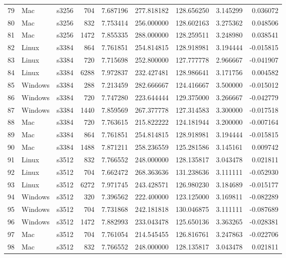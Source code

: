 \documentclass{IEEEtran}
\begin{document}
\begin{longtable}{rllrrrrrr}
  79 & Mac & s3256 &     704 & 7.687196 & 277.818182 & 128.656250 & 3.145299 & 0.036072 \\ 
  80 & Mac & s3256 &     832 & 7.753414 & 256.000000 & 128.602163 & 3.275362 & 0.048506 \\ 
  81 & Mac & s3256 &    1472 & 7.855335 & 288.000000 & 128.259511 & 3.248980 & 0.038541 \\ 
  82 & Linux & s3384 &     864 & 7.761851 & 254.814815 & 128.918981 & 3.194444 & -0.015815 \\ 
  83 & Linux & s3384 &     720 & 7.715698 & 252.800000 & 127.777778 & 2.966667 & -0.041907 \\ 
  84 & Linux & s3384 &    6288 & 7.972837 & 232.427481 & 128.986641 & 3.171756 & 0.004582 \\ 
  85 & Windows & s3384 &     288 & 7.213459 & 282.666667 & 124.416667 & 3.500000 & -0.015012 \\ 
  86 & Windows & s3384 &     720 & 7.747280 & 223.644444 & 129.375000 & 3.266667 & -0.042779 \\ 
  87 & Windows & s3384 &    1440 & 7.859569 & 267.377778 & 127.314583 & 3.300000 & -0.017518 \\ 
  88 & Mac & s3384 &     720 & 7.763615 & 215.822222 & 124.181944 & 3.200000 & -0.007164 \\ 
  89 & Mac & s3384 &     864 & 7.761851 & 254.814815 & 128.918981 & 3.194444 & -0.015815 \\ 
  90 & Mac & s3384 &    1488 & 7.871211 & 258.236559 & 125.281586 & 3.145161 & 0.009742 \\ 
  91 & Linux & s3512 &     832 & 7.766552 & 248.000000 & 128.135817 & 3.043478 & 0.021811 \\ 
  92 & Linux & s3512 &     704 & 7.662472 & 268.363636 & 131.238636 & 3.111111 & -0.052930 \\ 
  93 & Linux & s3512 &    6272 & 7.971745 & 243.428571 & 126.980230 & 3.184689 & -0.015177 \\ 
  94 & Windows & s3512 &     320 & 7.396562 & 222.400000 & 123.125000 & 3.169811 & -0.082289 \\ 
  95 & Windows & s3512 &     704 & 7.731868 & 242.181818 & 130.046875 & 3.111111 & -0.087689 \\ 
  96 & Windows & s3512 &    1472 & 7.882993 & 233.043478 & 125.650136 & 3.363265 & -0.028381 \\ 
  97 & Mac & s3512 &     704 & 7.761054 & 214.545455 & 126.816761 & 3.247863 & -0.022706 \\ 
  98 & Mac & s3512 &     832 & 7.766552 & 248.000000 & 128.135817 & 3.043478 & 0.021811 \\ 

\end{longtable}
\end{document}
